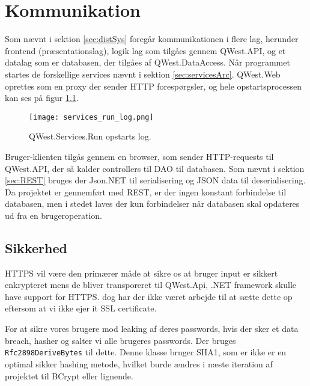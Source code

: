 \chapter{Kommunikation}\label{ch:communication}
Som nævnt i sektion \ref{sec:distSys} foregår kommunikationen i flere lag, herunder frontend (præsentationslag), logik lag som tilgåes gennem QWest.API, og et datalag som er databasen, der tilgåes af QWest.DataAccess. 
Når programmet startes de forskellige services nævnt i sektion \ref{sec:servicesArc}. QWest.Web oprettes som en proxy der sender HTTP forespørgsler, og hele opstartsprocessen kan ses på figur \ref{fig:startup_log}.

\begin{figure}
    \texttt{[image: services\_run\_log.png]}
    \caption{QWest.Services.Run opstarts log.}
    \label{fig:startup_log}
\end{figure}

Bruger-klienten tilgås gennem en browser, som sender HTTP-requests til QWest.API, der så kalder controllers til DAO til databasen. Som nævnt i sektion \ref{sec:REST} bruges der Json.NET til serialisering og JSON data til deserialisering. Da projektet er gennemført med REST, er der ingen konstant forbindelse til databasen, men i stedet laves der kun forbindelser når databasen skal opdateres ud fra en brugeroperation. 

\section{Sikkerhed}\label{sec:security}
HTTPS vil være den primærer måde at sikre os at bruger input er sikkert enkrypteret mens de bliver transporeret til QWest.Api, .NET framework skulle have support for HTTPS. \cite{DotNetFrameworkSSL} dog har der ikke været arbejde til at sætte dette op eftersom at vi ikke ejer it SSL certificate.

For at sikre vores brugere mod leaking af deres passwords, hvis der sker et data breach, hasher og salter vi alle brugeres passwords. Der bruges \texttt{Rfc2898DeriveBytes} \cite{Rfc2898DeriveBytes} til dette. Denne klasse bruger SHA1, som er ikke er en optimal sikker hashing metode, hvilket burde ændres i næste iteration af projektet \cite{HowsecureisSHA1} til BCrypt \cite{BCrypt} eller lignende.

